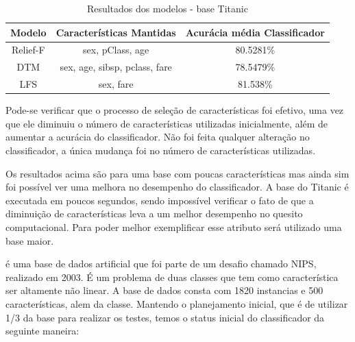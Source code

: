 \begin{table}[H]
\centering
\caption{Resultados dos modelos - base Titanic}
\label{my-label}
\begin{tabular}{|c|c|c|}
\hline
\multicolumn{1}{|l|}{\textbf{Modelo}} & \textbf{Características Mantidas} & \multicolumn{1}{l|}{\textbf{Acurácia média Classificador}} \\ \hline
Relief-F                              & sex, pClass, age                  & 80.5281\%                                            \\ \hline
DTM                                   & sex, age, sibsp, pclass, fare     & 78.5479\%                                            \\ \hline
LFS                                   & sex, fare                         & 81.538\%                                             \\ \hline
\end{tabular}
\end{table}

Pode-se verificar que o processo de seleção de características foi efetivo, uma vez que ele diminuiu o número de características utilizadas inicialmente, além de aumentar a acurácia do classificador. Não foi feita qualquer alteração no classificador, a única mudança foi no número de características utilizadas.

Os resultados acima são para uma base com poucas características mas ainda sim foi possível ver uma melhora no desempenho do classificador. A base do Titanic é executada em poucos segundos, sendo impossível verificar o fato de que a diminuição de características leva a um melhor desempenho no quesito computacional. Para poder melhor exemplificar esse atributo será utilizado uma base maior. 

 é uma base de dados artificial que foi parte de um desafio chamado NIPS, realizado em 2003. É um problema de duas classes que tem como característica ser altamente não linear. A base de dados consta com 1820 instancias e 500 características, alem da classe. Mantendo o planejamento inicial, que é de utilizar 1/3 da base para realizar os testes, temos o status inicial do classificador da seguinte maneira:

